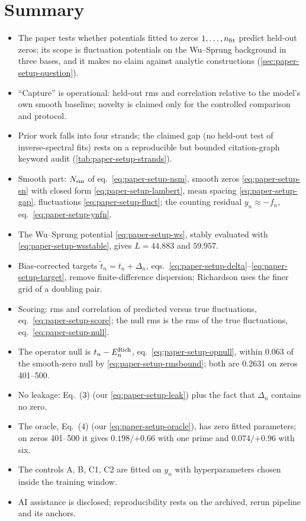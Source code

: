 \section{Summary}\label{sec:paper-setup-summary}

\begin{itemize}
\item The paper tests whether potentials fitted to zeros $1,\dots,n_{\rm fit}$ predict held-out zeros; its scope is fluctuation potentials on the Wu--Sprung background in three bases, and it makes no claim against analytic constructions (\cref{sec:paper-setup-question}).
\item ``Capture'' is operational: held-out rms and correlation relative to the model's own smooth baseline; novelty is claimed only for the controlled comparison and protocol.
\item Prior work falls into four strands; the claimed gap (no held-out test of inverse-spectral fits) rests on a reproducible but bounded citation-graph keyword audit (\cref{tab:paper-setup-strands}).
\item Smooth part: $N_{\mathrm{sm}}$ of eq.~\eqref{eq:paper-setup-nsm}, smooth zeros \eqref{eq:paper-setup-sn} with closed form \eqref{eq:paper-setup-lambert}, mean spacing \eqref{eq:paper-setup-gap}, fluctuations \eqref{eq:paper-setup-fluct}; the counting residual $y_n\approx-f_n$, eq.~\eqref{eq:paper-setup-ynfn}.
\item The Wu--Sprung potential \eqref{eq:paper-setup-ws}, stably evaluated with \eqref{eq:paper-setup-wsstable}, gives $L=44.883$ and $59.957$.
\item Bias-corrected targets $\tilde t_n=t_n+\Delta_n$, eqs.~\eqref{eq:paper-setup-delta}--\eqref{eq:paper-setup-target}, remove finite-difference dispersion; Richardson uses the finer grid of a doubling pair.
\item Scoring: rms and correlation of predicted versus true fluctuations, eq.~\eqref{eq:paper-setup-score}; the null rms is the rms of the true fluctuations, eq.~\eqref{eq:paper-setup-null}.
\item The operator null is $t_n-E^{\rm Rich}_n$, eq.~\eqref{eq:paper-setup-opnull}, within $0.063$ of the smooth-zero null by \eqref{eq:paper-setup-rmsbound}; both are 0.2631 on zeros 401--500.
\item No leakage: Eq.~(3) (our \eqref{eq:paper-setup-leak}) plus the fact that $\Delta_n$ contains no zero.
\item The oracle, Eq.~(4) (our \eqref{eq:paper-setup-oracle}), has zero fitted parameters; on zeros 401--500 it gives $0.198/{+0.66}$ with one prime and $0.074/{+0.96}$ with six.
\item The controls A, B, C1, C2 are fitted on $y_n$ with hyperparameters chosen inside the training window.
\item AI assistance is disclosed; reproducibility rests on the archived, rerun pipeline and its anchors.
\end{itemize}

